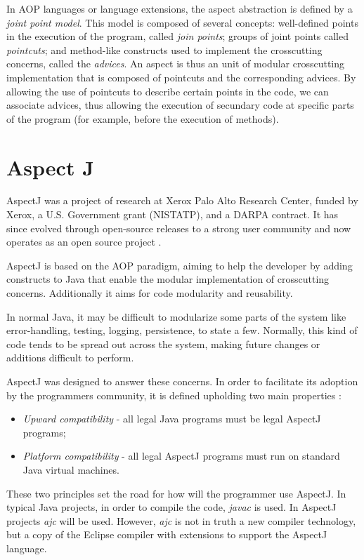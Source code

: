 \documentclass{template}
\begin{document}
In AOP languages or language extensions, the aspect abstraction is defined by a \emph{joint point model}.
This model is composed of several concepts: well-defined points in the execution of the program,
called \emph{join points}; groups of joint points called \emph{pointcuts}; and method-like constructs used to
implement the crosscutting concerns, called the \emph{advices}. An aspect is thus an unit of modular
crosscutting implementation that is composed of pointcuts and the corresponding advices. By allowing the
use of pointcuts to describe certain points in the code, we can associate advices, thus allowing the execution
of secundary code at specific parts of the program (for example, before the execution of methods).

\section{Aspect J}

AspectJ was a project of research at Xerox Palo Alto Research Center, funded by Xerox, a U.S. Government grant (NISTATP), and a DARPA contract. It has since evolved through open-source releases to a strong user community and now operates as an open source project \cite{AspectJ}.

AspectJ is based on the AOP paradigm, aiming to help the developer by adding constructs to Java that enable the modular implementation of crosscutting concerns. Additionally it aims for code modularity and reusability.

In normal Java, it may be difficult to modularize some parts of the system like error-handling, testing, logging, persistence, to state a few. Normally, this kind of code tends to be spread out across the system, making future changes or additions difficult to perform. 

AspectJ was designed to answer these concerns. In order to facilitate its adoption by the programmers community, it is defined upholding two main properties \cite{Kiczales97aspect-orientedprogramming}:

\begin{itemize}
\item \textit{Upward compatibility} - all legal Java programs must be legal AspectJ programs;
\item \textit{Platform compatibility} - all legal AspectJ programs must run on standard Java virtual machines. 
\end{itemize}

These two principles set the road for how will the programmer use AspectJ. In typical Java projects, in order to compile the code, \textit{javac} is used. In AspectJ projects \textit{ajc} will be used. However, \textit{ajc} is not in truth a new compiler technology, but a copy of the Eclipse compiler with extensions to support the AspectJ language. 
\end{document}
